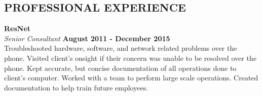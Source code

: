\documentclass[margin,line]{resume}
\begin{document}
\begin{resume}
\sectionline
    \section{\mysidestyle \textbf{\large{P}\small{ROFESSIONAL} \large{E}\small{XPERIENCE}}}

    \textbf{\listing ResNet} \vspace{2mm}\\\vspace{1mm}%
    \textsl{Senior Consultant} \hfill \textbf{August 2011 - December 2015}\\
 Troubleshooted hardware, software, and network related problems over the phone.
Visited client’s onsight if their concern was unable to be resolved over the phone. Kept
accurate, but concise documentation of all operations done to client’s computer. Worked
with a team to perform large scale operations. Created documentation to help train future
employees.









\end{resume}
\end{document}
